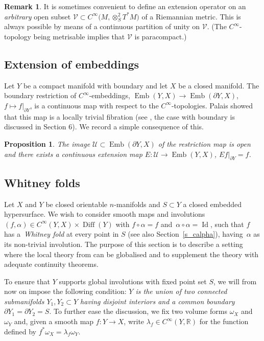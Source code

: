 \documentclass[10pt,a4paper]{amsart}
\numberwithin{equation}{section}
\newtheorem{Proposition}[Theorem]{Proposition}
\theoremstyle{definition}
\newtheorem{Remark}[Theorem]{Remark}
\newcommand{\R}{\mathbb{R}} %
\newcommand{\1}{{\bf 1}}
\newcommand{\Id}{\operatorname{Id}}
\DeclareMathOperator{\Diff}{Diff}
\begin{document}
\begin{Remark}\label{lem_rext2}
It is sometimes convenient to define an extension operator on an {\it arbitrary} open subset $\mathcal V\subset C^\infty\bigl(M,\otimes^2_ST^*M\bigr)$ of a Riemannian metric. This is always possible by means of a continuous partition of unity on $\mathcal V$. (The $C^\infty$-topology being metrisable implies that $\mathcal V$ is paracompact.)


\end{Remark}

\subsection{Extension of embeddings} Let $Y$ be a compact manifold with boundary and let $X$ be a closed manifold. The boundary restriction of $C^\infty$-embeddings,
$\operatorname{Emb}(Y,X)\to \operatorname{Emb}(\partial Y,X)$, $ f \mapsto f\vert_{\partial Y}$,
is a continuous map with respect to the $C^\infty$-topologies. Palais showed that this map is a locally trivial fibration (see \cite{Pal60}, the case with boundary is discussed in Section 6). We record a simple consequence of this.


\begin{Proposition}\label{prop_palais}
The image $\mathcal U\subset \operatorname{Emb}(\partial Y,X)$ of the restriction map is open and there exists a continuous extension map
$E\colon \mathcal U\to \operatorname{Emb}(Y,X)$, $ Ef|_{\partial Y} = f$.
\end{Proposition}


\subsection{Whitney folds}\label{s_whitney}

Let $X$ and $Y$ be closed orientable $n$-manifolds and $S\subset Y$ a closed embedded hypersurface. We wish to consider smooth maps and involutions
$(f,\alpha)\in C^\infty(Y,X)\times \Diff(Y)$ with $ f\circ \alpha = f $ and~${\alpha\circ \alpha=\Id}$,
such that $f$ has a~{\it Whitney fold} at every point in $S$ (see also Section~\ref{s_calpha}), having~$\alpha$ as its non-trivial involution. The purpose of this section is to describe a setting where the local theory from \cite[Section C.4]{Hor07} can be globalised and to supplement the theory with adequate continuity theorems.

To ensure that $Y$ supports global involutions with fixed point set $S$, we will from now on impose the following condition: {\it $Y$ is the union of two connected submanifolds $Y_1,Y_2\subset Y$ having disjoint interiors and a common boundary $\partial Y_1=\partial Y_2 =S$}. To further ease the discussion, we fix two volume forms $\omega_X$ and $\omega_Y$ and, given a smooth map $f\colon Y\to X$, write $\lambda_f\in C^\infty(Y,\R)$ for the function defined by $f^*\omega_X=\lambda_f \omega_Y$.
\end{document}
